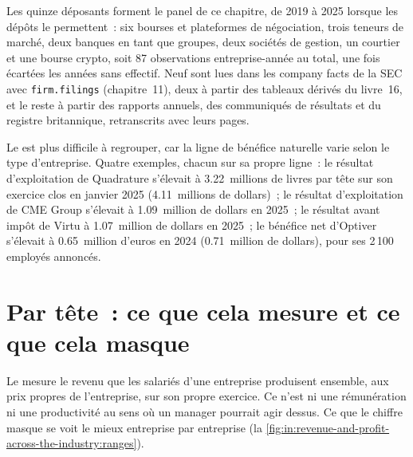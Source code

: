 Les quinze déposants forment le panel de ce chapitre, de 2019 à 2025 lorsque les dépôts le permettent~: six bourses et
plateformes de négociation, trois teneurs de marché, deux banques en tant que groupes, deux sociétés de gestion, un courtier et une bourse crypto, soit 87
observations entreprise-année au total, une fois écartées les années sans effectif. Neuf sont lues dans les company facts de la SEC avec
\texttt{firm.filings} (chapitre~11), deux à partir des tableaux dérivés du livre~16, et le reste à partir des rapports annuels, des communiqués de résultats
et du registre britannique, retranscrits avec leurs pages.

Le  est plus difficile à regrouper, car la ligne de bénéfice naturelle varie selon le type d'entreprise. Quatre exemples, chacun sur sa
propre ligne~: le résultat d'exploitation de Quadrature s'élevait à 3.22~millions de livres par tête sur son exercice clos en janvier 2025 (4.11~millions de dollars)~;
le résultat d'exploitation de CME Group s'élevait à 1.09~million de dollars en 2025~; le résultat avant impôt de Virtu à 1.07~million de dollars en 2025~; le bénéfice net d'Optiver
s'élevait à 0.65~million d'euros en 2024 (0.71~million de dollars), pour ses 2\,100 employés annoncés.

\section{Par tête~: ce que cela mesure et ce que cela masque}

Le  mesure le revenu que les salariés d'une entreprise produisent ensemble, aux prix propres de l'entreprise, sur son propre
exercice. Ce n'est ni une rémunération ni une productivité au sens où un manager pourrait agir dessus. Ce que le chiffre masque se voit le mieux entreprise par
entreprise (la \cref{fig:in:revenue-and-profit-across-the-industry:ranges}).

